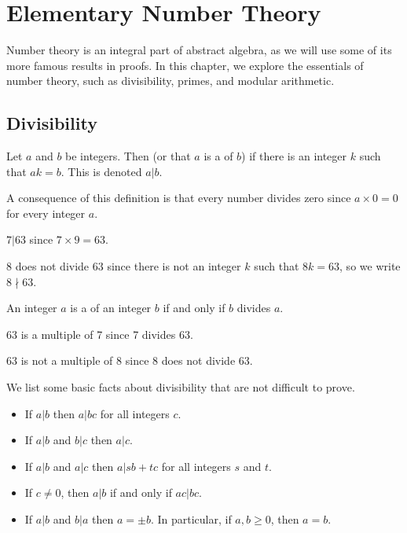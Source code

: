 \chapter{Elementary Number Theory}
Number theory is an integral part of abstract algebra, as we will use some of its more famous results in proofs. In this chapter, we explore the essentials of number theory, such as divisibility, primes, and modular arithmetic.

\section{Divisibility}
\begin{definition}
    Let $a$ and $b$ be integers. Then  (or that $a$ is a  of $b$) if there is an integer $k$ such that $ak = b$. This is denoted $a\vert b$.
\end{definition}
\begin{remark}
    A consequence of this definition is that every number divides zero since $a \times 0 = 0$ for every integer $a$.
\end{remark}

\begin{example}
    $7\vert 63$ since $7 \times 9 = 63$.
\end{example}

\begin{example}
    8 does not divide 63 since there is not an integer $k$ such that $8k = 63$, so we write $8 \nmid 63$.
\end{example}

\begin{definition}
    An integer $a$ is a  of an integer $b$ if and only if $b$ divides $a$.
\end{definition}

\begin{example}
    63 is a multiple of 7 since 7 divides 63.
\end{example}

\begin{example}
    63 is not a multiple of 8 since 8 does not divide 63.
\end{example}

We list some basic facts about divisibility that are not difficult to prove.
\begin{itemize}
    \item If $a\vert b$ then $a\vert bc$ for all integers $c$.
    \item If $a\vert b$ and $b\vert c$ then $a\vert c$.
    \item If $a\vert b$ and $a\vert c$ then $a\vert sb+tc$ for all integers $s$ and $t$.
    \item If $c \neq 0$, then $a\vert b$ if and only if $ac\vert bc$.
    \item If $a \vert b$ and $b \vert a$ then $a = \pm b$. In particular, if $a,b\geq 0$, then $a = b$.
\end{itemize}


